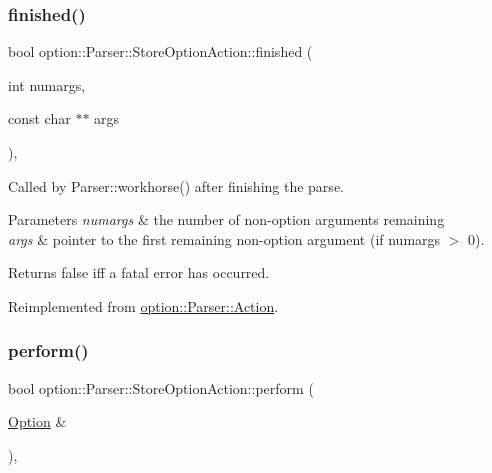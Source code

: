 \subsubsection{\texorpdfstring{finished()}{finished()}}
{\footnotesize\ttfamily bool option\+::\+Parser\+::\+Store\+Option\+Action\+::finished (\begin{DoxyParamCaption}\item[{int}]{numargs,  }\item[{const char $\ast$$\ast$}]{args }\end{DoxyParamCaption})\hspace{0.3cm}{\ttfamily [inline]}, {\ttfamily [virtual]}}



Called by Parser\+::workhorse() after finishing the parse. 


\begin{DoxyParams}{Parameters}
{\em numargs} & the number of non-\/option arguments remaining \\
\hline
{\em args} & pointer to the first remaining non-\/option argument (if numargs $>$ 0).\\
\hline
\end{DoxyParams}
\begin{DoxyReturn}{Returns}
{\ttfamily false} iff a fatal error has occurred. 
\end{DoxyReturn}


Reimplemented from \hyperlink{structoption_1_1Parser_1_1Action_a3ec558b51e34d33d116f14587289e032}{option\+::\+Parser\+::\+Action}.

\mbox{\label{classoption_1_1Parser_1_1StoreOptionAction_a8931919fba5516377c202920db2b2f84}} 
\subsubsection{\texorpdfstring{perform()}{perform()}}
{\footnotesize\ttfamily bool option\+::\+Parser\+::\+Store\+Option\+Action\+::perform (\begin{DoxyParamCaption}\item[{\hyperlink{classoption_1_1Option}{Option} \&}]{ }\end{DoxyParamCaption})\hspace{0.3cm}{\ttfamily [inline]}, {\ttfamily [virtual]}}



